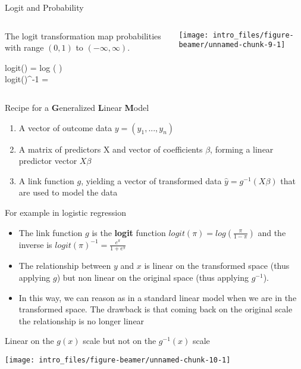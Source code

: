 \documentclass[
  ignorenonframetext,
]{beamer}
\providecommand{\tightlist}{%
  \setlength{\itemsep}{0pt}\setlength{\parskip}{0pt}}
\begin{document}
\begin{frame}{Logit and Probability}
\protect\hypertarget{logit-and-probability}{}
\begin{columns}
\begin{column}{0.3\textwidth}

The logit transformation map probabilities with range $(0, 1)$ to $(-\infty, \infty)$.

\begin{multiline}
logit(\pi) = log \left( \right) \\
logit(\pi)^{-1} = 
\end{multiline}

\end{column}
\begin{column}{0.7\textwidth}


\begin{center}\texttt{[image: intro\_files/figure-beamer/unnamed-chunk-9-1]} \end{center}

\end{column}
\end{columns}
\end{frame}

\begin{frame}{Recipe for a \textbf{G}eneralized \textbf{L}inear
\textbf{M}odel}
\protect\hypertarget{recipe-for-a-generalized-linear-model}{}
\begin{enumerate}
\tightlist
\item
  A vector of outcome data \(y = (y_1,..., y_n)\)
\item
  A matrix of predictors X and vector of coefficients \(\beta\), forming
  a linear predictor vector \(X\beta\)
\item
  A link function \(g\), yielding a vector of transformed data
  \(\hat y = g^{−1}(X\beta)\) that are used to model the data
\end{enumerate}
\end{frame}

\begin{frame}{For example in logistic regression}
\protect\hypertarget{for-example-in-logistic-regression}{}
\begin{itemize}
\tightlist
\item
  The link function \(g\) is the \textbf{logit} function
  \(logit(\pi) = log \left( \frac{\pi}{1-\pi}\right)\) and the inverse
  is \(logit(\pi)^{-1} = \frac{e^{\pi}}{1 + e^{\pi}}\)
\item
  The relationship between \(y\) and \(x\) is linear on the transformed
  space (thus applying \(g\)) but non linear on the original space (thus
  applying \(g^{-1}\)).
\item
  In this way, we can reason as in a standard linear model when we are
  in the transformed space. The drawback is that coming back on the
  original scale the relationship is no longer linear
\end{itemize}
\end{frame}

\begin{frame}{Linear on the \(g(x)\) scale but not on the \(g^{-1}(x)\)
scale}
\protect\hypertarget{linear-on-the-gx-scale-but-not-on-the-g-1x-scale}{}
\begin{center}\texttt{[image: intro\_files/figure-beamer/unnamed-chunk-10-1]} \end{center}
\end{frame}
\end{document}
